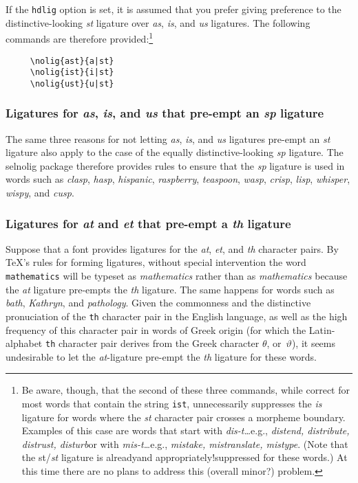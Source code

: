 \documentclass[11pt]{article}
\newcommand{\pkg}[1]{\textsf{#1}}
\newcommand{\opt}[1]{\texttt{#1}}
\begin{document}
If the \opt{hdlig} option is set, it is assumed that you prefer giving preference to the distinctive-looking \emph{st} ligature over \emph{as}, \emph{is}, and \emph{us} ligatures. The following commands are therefore provided:\footnote{Be aware, though, that the second of these three commands, while correct for most words that contain the string \opt{ist}, unnecessarily suppresses the \emph{is} ligature for words where the \emph{st} character pair crosses a morpheme boundary. Examples of this case are words that start with \emph{dis-t\ldots}\textemdash e.g., \emph{distend, distribute, distrust, disturb}\textemdash or with \emph{mis-t\ldots}\textemdash e.g., \emph{mistake, mistranslate, mistype}. (Note that the st/\emph{st} ligature is already\textemdash and appropriately!\textemdash suppressed for these words.) At this time there are no plans to address this (overall minor?) problem.}
\begin{Verbatim}
     \nolig{ast}{a|st}
     \nolig{ist}{i|st}
     \nolig{ust}{u|st}
\end{Verbatim}



\subsubsection*{Ligatures for \emph{as}, \emph{is}, and \emph{us} that pre-empt an \emph{sp} ligature}

The same three reasons for not letting \emph{as}, \emph{is}, and \emph{us} ligatures pre-empt an \emph{st} ligature also apply to the case of the equally distinctive-looking \emph{sp} ligature. The \pkg{selnolig} package therefore provides rules to ensure that the \emph{sp} ligature is used in words such as \emph{clasp}, \emph{hasp}, \emph{hispanic}, \emph{raspberry}, \emph{teaspoon}, \emph{wasp}, \emph{crisp}, \emph{lisp}, \emph{whisper}, \emph{wispy}, and \emph{cusp}. 



\subsubsection*{Ligatures for \emph{at} and \emph{et} that pre-empt a \emph{th} ligature}

Suppose that a font provides ligatures for the \emph{at}, \emph{et}, and \emph{th} character pairs. By \TeX's rules for forming ligatures, without special intervention the word \opt{mathematics} will be typeset as \emph{m\mbox{at}hematics} rather than as \emph{mathematics} because the \emph{at} ligature pre-empts the \emph{th} ligature. The same happens for words such as \emph{b\mbox{at}h}, \emph{K\mbox{at}hryn}, and \emph{p\mbox{at}hology}.
Given the commonness and the distinctive pronuciation of the \opt{th} character pair in the English language, as well as the high frequency of this character pair in words of Greek origin (for which the Latin-alphabet \opt{th} character pair derives from the Greek character $\theta$, or~$\vartheta$), it seems undesirable to let the \emph{at}-ligature pre-empt the \emph{th} ligature for these words. 
\end{document}
